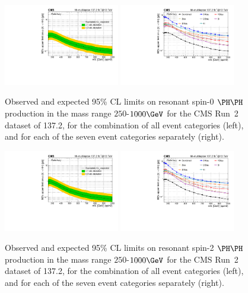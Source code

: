 \begin{figure}
  \centering
  \includegraphics[width=0.45\textwidth]{figures/massScan_spin0_multilepton_RUN2.pdf}
  \hspace{0.05\textwidth}
  \includegraphics[width=0.45\textwidth]{figures/massMultiScan_spin0_multilepton_Run2.pdf}
  \caption{
    Observed and expected 95\% CL limits on resonant spin-0 $\HH$ production in
    the mass range $250$-$1000\GeV$ for the CMS Run~2 dataset of 137.2\fbinv,
    for the combination of all event categories (left),
    and for each of the seven event categories separately (right).
  }
  \label{fig:HH_limits_spin0}
\end{figure}

\begin{figure}
  \centering
  \includegraphics[width=0.45\textwidth]{figures/massScan_spin2_multilepton_RUN2.pdf}
  \hspace{0.05\textwidth}
  \includegraphics[width=0.45\textwidth]{figures/massMultiScan_spin2_multilepton_Run2.pdf}
  \caption{
    Observed and expected 95\% CL limits on resonant spin-2 $\HH$ production in
    the mass range $250$-$1000\GeV$ for the CMS Run~2 dataset of 137.2\fbinv,
    for the combination of all event categories (left),
    and for each of the seven event categories separately (right).
  }
  \label{fig:HH_limits_spin2}
\end{figure}
